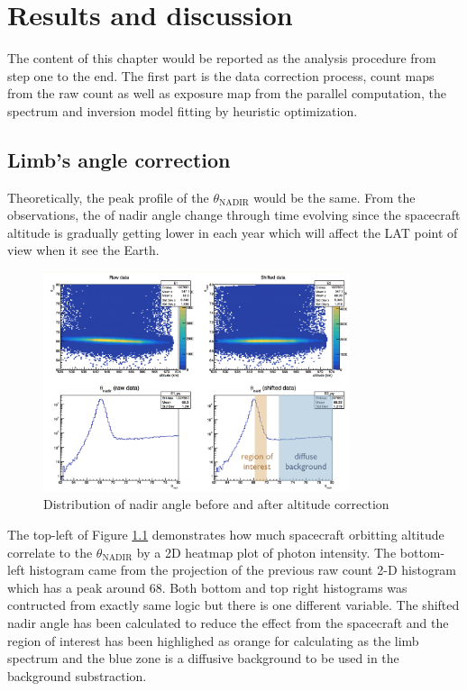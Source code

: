 \chapter{Results and discussion}

The content of this chapter would be reported as the analysis 
procedure from step one to the end. The first part is the data 
correction process, count maps from the raw count as well as 
exposure map from the parallel computation, the spectrum and 
inversion model fitting by heuristic optimization.

\section{Limb's angle correction}
Theoretically, the peak profile of the $\theta_\text{NADIR}$ would be
the same. From the observations, the of nadir angle change through time 
evolving since the spacecraft altitude is gradually getting lower
in each year which will affect the LAT point of view when it see 
the Earth.

\begin{figure}[h!]
    \centering
    \includegraphics[width=0.8\textwidth]{content/result_and_discussion/figures/LATShifted.png}
    \caption{Distribution of nadir angle before and after altitude correction}
    \label{fig:lat_nadir_shifted}
\end{figure}


The top-left of Figure \ref{fig:lat_nadir_shifted} demonstrates how 
much spacecraft orbitting altitude correlate to the $\theta_\text{NADIR}$
by a 2D heatmap plot of photon intensity. The bottom-left histogram
came from the projection of the previous raw count 2-D histogram which 
has a peak around 68\textdegree. Both bottom and top right histograms
was contructed from exactly same logic but there is one different 
variable. The shifted nadir angle has been calculated to reduce the 
effect from the spacecraft and the region of interest has been highlighed 
as orange for calculating as the limb spectrum and the blue zone is 
a diffusive background to be used in the background substraction.


